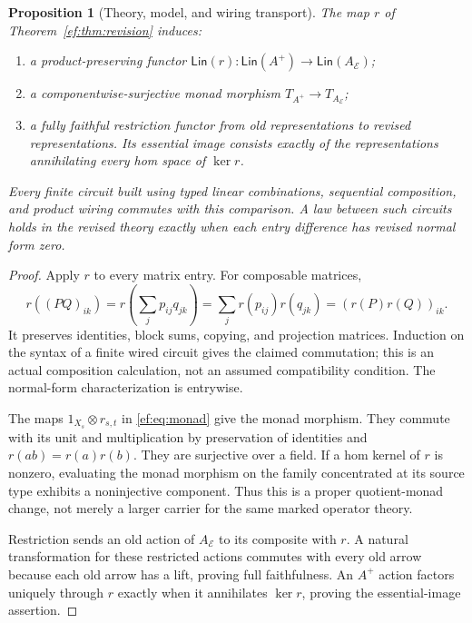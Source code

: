 \documentclass[11pt]{article}
\newtheorem{proposition}[theorem]{Proposition}
\theoremstyle{definition}
\theoremstyle{remark}\newtheorem{remark}[theorem]{Remark}
\begin{document}
\begin{proposition}[Theory, model, and wiring transport]
\label{ef:prop:theory}
The map $r$ of Theorem~\ref{ef:thm:revision} induces:
\begin{enumerate}
\item a product-preserving functor
      $\mathsf{Lin}(r):\mathsf{Lin}(A^+)\to\mathsf{Lin}(A_{\mathcal E})$;
\item a componentwise-surjective monad morphism
      $T_{A^+}\to T_{A_{\mathcal E}}$;
\item a fully faithful restriction functor from old representations to
      revised representations. Its essential image consists exactly of
      the representations annihilating every hom space of $\ker r$.
\end{enumerate}
Every finite circuit built using typed linear combinations, sequential
composition, and product wiring commutes with this comparison. A law
between such circuits holds in the revised theory exactly when each
entry difference has revised normal form zero.
\end{proposition}
\begin{proof}
Apply $r$ to every matrix entry. For composable matrices,
\[
 r((PQ)_{ik})=r\left(\sum_jp_{ij}q_{jk}\right)
            =\sum_jr(p_{ij})r(q_{jk})
            =(r(P)r(Q))_{ik}.
\]
It preserves identities, block sums, copying, and projection matrices.
Induction on the syntax of a finite wired circuit gives the claimed
commutation; this is an actual composition calculation, not an assumed
compatibility condition. The normal-form characterization is entrywise.

The maps $1_{X_s}\otimes r_{s,t}$ in \eqref{ef:eq:monad} give the monad
morphism. They commute with its unit and multiplication by preservation
of identities and $r(ab)=r(a)r(b)$. They are surjective over a field.
If a hom kernel of $r$ is nonzero, evaluating the monad morphism on the
family concentrated at its source type exhibits a noninjective component.
Thus this is a proper quotient-monad change, not merely a larger carrier
for the same marked operator theory.

Restriction sends an old action of $A_{\mathcal E}$ to its composite with
$r$. A natural transformation for these restricted actions commutes with
every old arrow because each old arrow has a lift, proving full
faithfulness. An $A^+$ action factors uniquely through $r$ exactly when it
annihilates $\ker r$, proving the essential-image assertion.
\end{proof}
\end{document}
